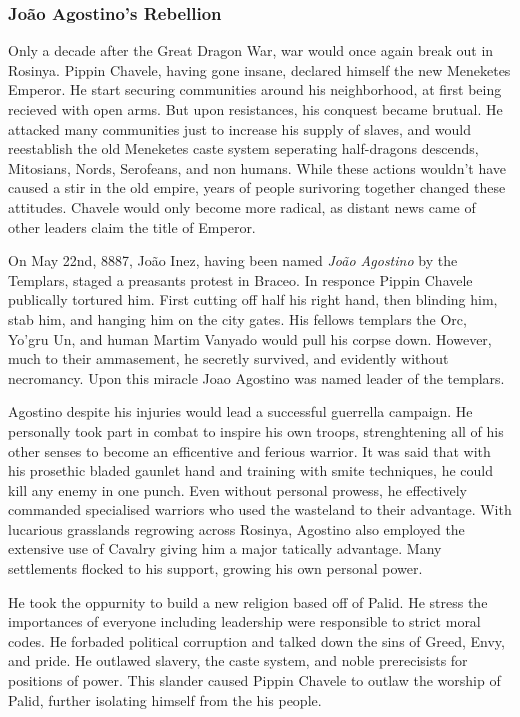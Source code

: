 \documentclass[../main.tex]{subfiles}
\begin{document}
\subsubsection{João Agostino's Rebellion}
Only a decade after the Great Dragon War, war would once again break out in Rosinya. Pippin Chavele, having gone 
insane, declared himself the new Meneketes Emperor. He start securing communities around his neighborhood, at first 
being recieved with open arms. But upon resistances, his conquest became brutual. He attacked many communities 
just to increase his supply of slaves, and would reestablish the old Meneketes caste system seperating half-dragons descends,
Mitosians, Nords, Serofeans, and non humans. While these actions wouldn't have caused a stir in the old empire, years of 
people surivoring together changed these attitudes. Chavele would only become more radical, as distant news 
came of other leaders claim the title of Emperor. 

On May 22nd, 8887, João Inez, having been named \emph{João Agostino} by the Templars, staged a preasants protest
in Braceo. In responce Pippin Chavele publically tortured him. First cutting off half his right hand, then
blinding him, stab him, and hanging him on the city gates. His fellows templars the Orc, Yo'gru Un, and human
Martim Vanyado would pull his corpse down. However, much to their ammasement, he secretly survived, and
evidently without necromancy. Upon this miracle Joao Agostino was named leader of the templars.

Agostino despite his injuries would lead a successful guerrella campaign. He personally took part in
combat to inspire his own troops, strenghtening all of his other senses to become an efficentive and 
ferious warrior. It was said that with his prosethic bladed gaunlet hand and training with smite techniques,
he could kill any enemy in one punch. Even without personal prowess, he effectively commanded specialised 
warriors who used the wasteland to their advantage. With lucarious grasslands regrowing across Rosinya, 
Agostino also employed the extensive use of Cavalry giving him a major tatically advantage.
Many settlements flocked to his support, growing his own personal power.  

He took the oppurnity to build a new religion based off of Palid. He stress the importances of everyone 
including leadership were responsible to strict moral codes. He forbaded political corruption and talked 
down the sins of Greed, Envy, and pride. He outlawed slavery, the caste system, and noble prerecisists for 
positions of power. This slander caused Pippin Chavele to outlaw the worship of Palid, further isolating 
himself from the his people.
\end{document}
